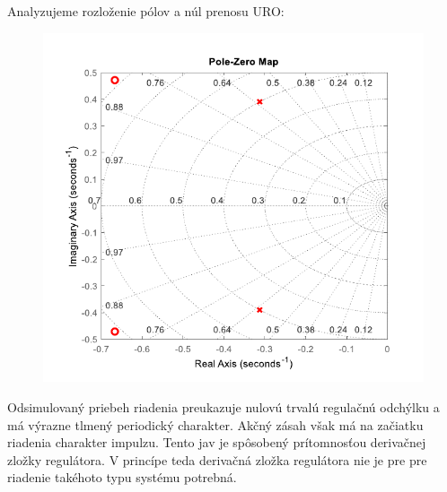 \documentclass[a4paper,10pt]{article}
\begin{document}
Analyzujeme rozloženie pólov a núl prenosu URO:
\begin{figure}[ht]
\centering
\includegraphics[scale=0.75]{pzmap_PID}
\end{figure}


Odsimulovaný priebeh riadenia preukazuje nulovú trvalú regulačnú odchýlku a má výrazne tlmený periodický charakter.
Akčný zásah však má na začiatku riadenia charakter impulzu. Tento jav je spôsobený prítomnosťou derivačnej zložky regulátora.
V princípe teda derivačná zložka regulátora nie je pre pre riadenie takéhoto typu systému potrebná.
\end{document}
